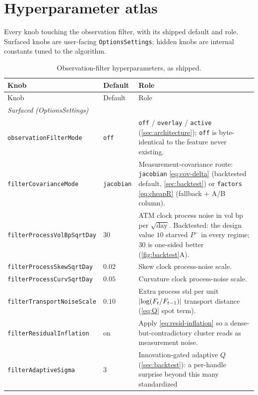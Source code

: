 \documentclass[11pt]{article}
\begin{document}
\appendix
\section{Hyperparameter atlas}
\label{app:atlas}

Every knob touching the observation filter, with its shipped default and role.
Surfaced knobs are user-facing \texttt{OptionsSettings}; hidden knobs are
internal constants tuned to the algorithm.

\begingroup
\small
\begin{longtable}{p{}p{}p{}}
\caption{Observation-filter hyperparameters, as shipped.}\label{tab:atlas}\\
\toprule Knob & Default & Role\\ \midrule
\endfirsthead \toprule Knob & Default & Role\\ \midrule \endhead
\multicolumn{3}{l}{\emph{Surfaced (OptionsSettings)}}\\ \midrule
\texttt{observationFilterMode} & \texttt{off} &
\texttt{off} / \texttt{overlay} / \texttt{active}
(\cref{sec:architecture}); \texttt{off} is byte-identical to the feature
never existing.\\
\texttt{filterCovarianceMode} & \texttt{jacobian} & Measurement-covariance
route: \texttt{jacobian} \cref{eq:cov-delta} (backtested default,
\cref{sec:backtest}) or \texttt{factors} \cref{eq:cheapR} (fallback + A/B
column).\\
\texttt{filterProcessVolBpSqrtDay} & $30$ & ATM clock process noise in vol bp
per $\sqrt{\text{day}}$. Backtested: the design value $10$ starved $P^-$ in
every regime; $30$ is one-sided better (\cref{fig:backtest}A).\\
\texttt{filterProcessSkewSqrtDay} & $0.02$ & Skew clock process-noise scale.\\
\texttt{filterProcessCurvSqrtDay} & $0.05$ & Curvature clock process-noise
scale.\\
\texttt{filterTransportNoiseScale} & $0.10$ & Extra process std per unit
$\lvert\log(F_t/F_{t-1})\rvert$ transport distance (\cref{eq:Q} spot term).\\
\texttt{filterResidualInflation} & on & Apply \cref{eq:resid-inflation} so a
dense-but-contradictory cluster reads as measurement noise.\\
\texttt{filterAdaptiveSigma} & $3$ & Innovation-gated adaptive $Q$
(\cref{sec:backtest}): a per-handle surprise beyond this many standardized

\end{longtable}
\end{document}
